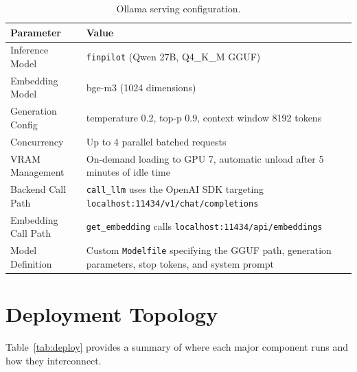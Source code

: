 \documentclass[11pt, a4paper]{article}
\begin{document}
\begin{table}[H]
\centering
\caption{Ollama serving configuration.}
\label{tab:ollama}
\renewcommand{\arraystretch}{1.35}
\begin{tabularx}{\textwidth}{M{3.0cm} L}
\toprule
\textbf{Parameter}     & \textbf{Value} \\
\midrule
Inference Model        & \texttt{finpilot} (Qwen 27B, Q4\_K\_M GGUF) \\
Embedding Model        & bge-m3 (1024 dimensions) \\
Generation Config      & temperature 0.2, top-p 0.9,
                         context window 8192 tokens \\
Concurrency            & Up to 4 parallel batched requests \\
VRAM Management        & On-demand loading to GPU 7, automatic unload
                         after 5 minutes of idle time \\
Backend Call Path       & \texttt{call\_llm} uses the OpenAI SDK
                         targeting
                         \texttt{localhost:11434/v1/chat/completions} \\
Embedding Call Path    & \texttt{get\_embedding} calls
                         \texttt{localhost:11434/api/embeddings} \\
Model Definition       & Custom \texttt{Modelfile} specifying the GGUF
                         path, generation parameters, stop tokens, and
                         system prompt \\
\bottomrule
\end{tabularx}
\end{table}


\section{Deployment Topology}

Table~\ref{tab:deploy} provides a summary of where each major
component runs and how they interconnect.
\end{document}
